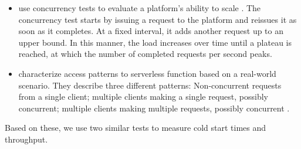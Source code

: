 \begin{itemize}
    \item \citeauthor{McGrath2017} use concurrency tests to evaluate a platform's ability to scale \cite{McGrath2017}. The concurrency test starts by issuing a request to the platform and reissues it as soon as it completes. At a fixed interval, it adds another request up to an upper bound. In this manner, the load increases over time until a plateau is reached, at which the number of completed requests per second peaks.
    \item \citeauthor{Hall2019} characterize access patterns to serverless function based on a real-world scenario. They describe three different patterns: Non-concurrent requests from a single client; multiple clients making a single request, possibly concurrent; multiple clients making multiple requests, possibly concurrent \cite{Hall2019}.
\end{itemize}

Based on these, we use two similar tests to measure cold start times and throughput.

